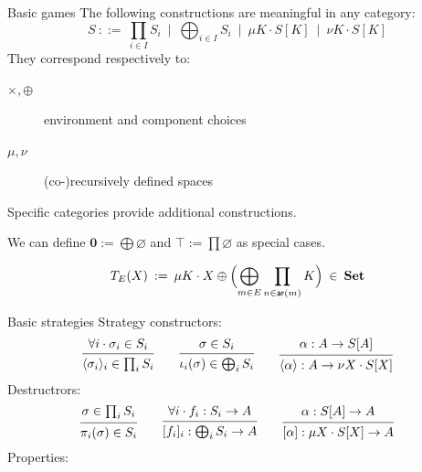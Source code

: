 \documentclass[aspectratio=1610,mathserif]{beamer}
\begin{document}
\begin{frame}{Basic games}
  The following constructions are meaningful in any category:
  \[
    S \: ::= \:
      \prod_{i\in I} S_i \:\mid\: \bigoplus_{i \in I} S_i \:\mid\:
      \mu K \cdot S[K] \:\mid\: \nu K \cdot S[K]
  \]
  They correspond respectively to:
  \begin{description}
    \item[$\times, \oplus$] environment and component choices
    \item[$\mu, \nu$] (co-)recursively defined spaces
  \end{description}
  Specific categories provide additional constructions.

  \vspace{1em}
  We can define
  $\mathbf{0} := \bigoplus \varnothing$ and
  $\top := \prod \varnothing$
  as special cases.

  \pause
  \vspace{1em}
  \begin{example}
    \[ T_E(X) \: := \:
         \mu K \cdot X \oplus \Bigl(
           \bigoplus_{m \in E} \prod_{n \in \mathsf{ar}(m)} K
         \Bigr) \: \in \: \mathbf{Set} \]
  \end{example}
\end{frame}

\begin{frame}{Basic strategies}
  Strategy constructors:
  \[
    \begin{prooftree}
      \hypo{\forall i \cdot \sigma_i \in S_i}
      \infer1{\langle \sigma_i \rangle_i \in \prod_i S_i}
    \end{prooftree}
    \qquad
    \begin{prooftree}
      \hypo{\sigma \in S_i}
      \infer1{\iota_i(\sigma) \in \bigoplus_i S_i}
    \end{prooftree}
    \qquad
    \begin{prooftree}
      \hypo{\alpha : A \rightarrow S[A]}
      \infer1{\langle \alpha \rangle : A \rightarrow \nu X \cdot S[X]}
    \end{prooftree}
  \]
  Destructrors:
  \[
    \begin{prooftree}
      \hypo{\sigma \in \prod_i S_i}
      \infer1{\pi_i(\sigma) \in S_i}
    \end{prooftree}
    \qquad
    \begin{prooftree}
      \hypo{\forall i \cdot f_i : S_i \rightarrow A}
      \infer1{[f_i]_i : \bigoplus_i S_i \rightarrow A}
    \end{prooftree}
    \qquad
    \begin{prooftree}
      \hypo{\alpha : S[A] \rightarrow A}
      \infer1{[\alpha] : \mu X \cdot S[X] \rightarrow A}
    \end{prooftree}
  \]
  Properties:
  \[
  \]
\end{frame}
\end{document}
